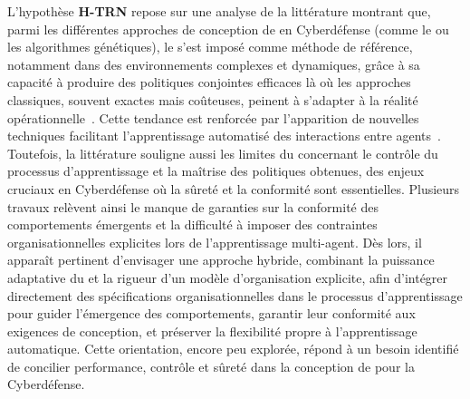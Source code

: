 \noindent L'hypothèse \textbf{H-TRN} repose sur une analyse de la littérature montrant que, parmi les différentes approches de conception de  en Cyberdéfense (comme le  ou les algorithmes génétiques), le  s'est imposé comme méthode de référence, notamment dans des environnements complexes et dynamiques, grâce à sa capacité à produire des politiques conjointes efficaces là où les approches classiques, souvent exactes mais coûteuses, peinent à s'adapter à la réalité opérationnelle~\cite{Zhang2021}. Cette tendance est renforcée par l'apparition de nouvelles techniques facilitant l'apprentissage automatisé des interactions entre agents~\cite{foerster2018communication}. Toutefois, la littérature souligne aussi les limites du  concernant le contrôle du processus d'apprentissage et la maîtrise des politiques obtenues, des enjeux cruciaux en Cyberdéfense où la sûreté et la conformité sont essentielles. Plusieurs travaux relèvent ainsi le manque de garanties sur la conformité des comportements émergents et la difficulté à imposer des contraintes organisationnelles explicites lors de l'apprentissage multi-agent. Dès lors, il apparaît pertinent d'envisager une approche hybride, combinant la puissance adaptative du  et la rigueur d'un modèle d'organisation explicite, afin d'intégrer directement des spécifications organisationnelles dans le processus d'apprentissage pour guider l'émergence des comportements, garantir leur conformité aux exigences de conception, et préserver la flexibilité propre à l'apprentissage automatique. Cette orientation, encore peu explorée, répond à un besoin identifié de concilier performance, contrôle et sûreté dans la conception de  pour la Cyberdéfense.

\medskip

